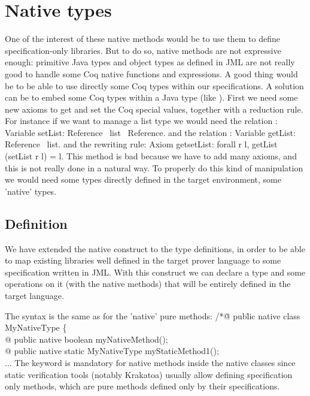 \section{Native types}
One of the interest of these native methods would be to use them to define  
specification-only libraries. But to do so, native methods are not expressive 
enough: primitive Java types and object types as defined in JML are not 
really good to handle some Coq native functions and expressions.
A good thing would be to be able to use directly some Coq types within our 
specifications.
A solution can be to embed some Coq types within a Java type 
(like ).
First we need some new axioms to get and set the Coq special values, together with a reduction rule. 
For instance if we want to manage a list type
we would need the relation :
\btab
Variable setList: Reference \rarrow \ list \rarrow \ Reference.
\etab
and the relation :
\btab
Variable getList:  Reference \rarrow \ list.
\etab
and the rewriting rule:
\btab
Axiom getsetList: forall r l, getList (setList r l) = l.
\etab 
This method is bad because we have to add many axioms, and this is not really 
done in a natural way.
To properly do this kind of manipulation we would need some types directly defined 
in the target environment,  some 'native' types.

\subsection{Definition}
We have extended the native construct to the type definitions, in order to be able to map
existing libraries well defined in the target prover language to some specification written in
JML. With this construct we can declare a type and some operations on it (with the native methods)
that will be entirely defined in the target language.

The syntax is the same as for the 'native' pure methods:
\btab
/*\=@ pub\=lic native class MyNativeType \{\+\\
   @ \> public native boolean myNativeMethod();\\
   @ \> public native static MyNativeType myStaticMethod1();\\
   ...
\etab
The  keyword is mandatory for native methods inside the native classes 
since static verification tools (notably Krakatoa) usually allow defining specification only 
methods, which are pure methods defined only by their specifications.

